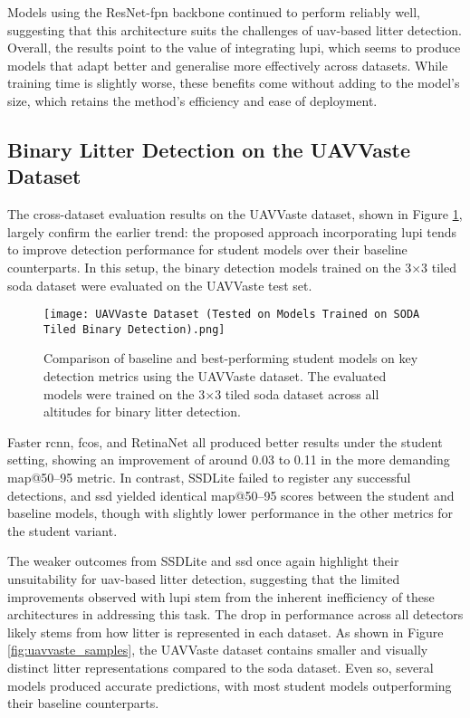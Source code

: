 Models using the ResNet-\gls{fpn} backbone continued to perform reliably well, suggesting that this architecture suits the challenges of \gls{uav}-based litter detection. Overall, the results point to the value of integrating \gls{lupi}, which seems to produce models that adapt better and generalise more effectively across datasets. While training time is slightly worse, these benefits come without adding to the model’s size, which retains the method's efficiency and ease of deployment.


\subsection{Binary Litter Detection on the UAVVaste Dataset}
\label{subsec:5_uavvaste_exp}

The cross-dataset evaluation results on the UAVVaste dataset, shown in Figure \ref{fig:uavvaste_bar}, largely confirm the earlier trend: the proposed approach incorporating \gls{lupi} tends to improve detection performance for student models over their baseline counterparts. In this setup, the binary detection models trained on the 3$\times$3 tiled \gls{soda} dataset were evaluated on the UAVVaste test set.

\begin{figure}[!ht]
    \centering
    \texttt{[image: UAVVaste Dataset (Tested on Models Trained on SODA Tiled Binary Detection).png]}
    \caption{Comparison of baseline and best-performing student models on key detection metrics using the UAVVaste dataset. The evaluated models were trained on the 3$\times$3 tiled \gls{soda} dataset across all altitudes for binary litter detection.}
    \label{fig:uavvaste_bar}
\end{figure}

Faster \gls{rcnn}, \gls{fcos}, and RetinaNet all produced better results under the student setting, showing an improvement of around 0.03 to 0.11 in the more demanding \gls{map}@50--95 metric. In contrast, SSDLite failed to register any successful detections, and \gls{ssd} yielded identical \gls{map}@50--95 scores between the student and baseline models, though with slightly lower performance in the other metrics for the student variant.

The weaker outcomes from SSDLite and \gls{ssd} once again highlight their unsuitability for \gls{uav}-based litter detection, suggesting that the limited improvements observed with \gls{lupi} stem from the inherent inefficiency of these architectures in addressing this task.
The drop in performance across all detectors likely stems from how litter is represented in each dataset. As shown in Figure \ref{fig:uavvaste_samples}, the UAVVaste dataset contains smaller and visually distinct litter representations compared to the \gls{soda} dataset. Even so, several models produced accurate predictions, with most student models outperforming their baseline counterparts.

